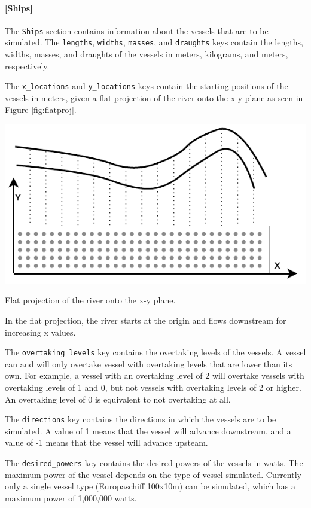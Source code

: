 \documentclass[
	a4paper, %
	12pt, %
]{persist}
\begin{document}
\paragraph{[Ships]}

The \verb|Ships| section contains information about the vessels that are to be simulated. The \verb|lengths|, \verb|widths|, \verb|masses|, and \verb|draughts| keys contain the lengths, widths, masses, and draughts of the vessels in meters, kilograms, and meters, respectively. 


The \verb|x_locations| and \verb|y_locations| keys contain the starting positions of the vessels in meters, given a flat projection of the river onto the x-y plane as seen in Figure \ref{fig:flatproj}.
\begin{marginfigure}
	\includegraphics[width=\linewidth]{img/flatproj.pdf}
	\caption{Flat projection of the river onto the x-y plane.}
	\label{fig:flatproj}
\end{marginfigure}
In the flat projection, the river starts at the origin and flows downstream for increasing x values.


The \verb|overtaking_levels| key contains the overtaking levels of the vessels. A vessel can and will only overtake vessel with overtaking levels that are lower than its own. For example, a vessel with an overtaking level of 2 will overtake vessels with overtaking levels of 1 and 0, but not vessels with overtaking levels of 2 or higher. An overtaking level of 0 is equivalent to not overtaking at all.


The \verb|directions| key contains the directions in which the vessels are to be simulated. A value of 1 means that the vessel will advance downstream, and a value of -1 means that the vessel will advance upsteam. 


The \verb|desired_powers| key contains the desired powers of the vessels in watts. The maximum power of the vessel depends on the type of vessel simulated. Currently only a single vessel type (Europaschiff 100x10m) can be simulated, which has a maximum power of 1,000,000 watts. 
\end{document}
